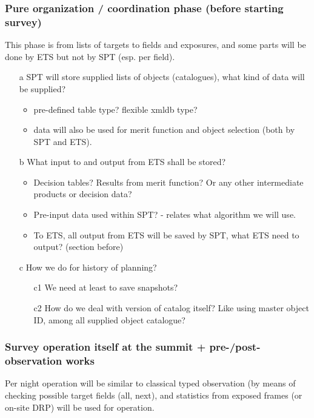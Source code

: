 \documentclass[a4paper,notitlepage]{article}
\begin{document}
\subsubsection{Pure organization / coordination phase (before starting survey)}

This phase is from lists of targets to fields and exposures, 
and some parts will be done by ETS but not by SPT (esp. per field). 

\begin{enumerate}
  \item[a] SPT will store supplied lists of objects (catalogues), what kind 
    of data will be supplied? 
    \begin{itemize}
      \item pre-defined table type? flexible xmldb type?
      \item data will also be used for merit function and object selection 
        (both by SPT and ETS).
    \end{itemize}
  \item[b] What input to and output from ETS shall be stored?
    \begin{itemize}
      \item Decision tables? Results from merit function? Or any other 
        intermediate products or decision data?
      \item Pre-input data used within SPT? - relates what algorithm we will use.
      \item To ETS, all output from ETS will be saved by SPT, what ETS need 
        to output? (section before)
    \end{itemize}
  \item[c] How we do for history of planning?
    \begin{enumerate}
      \item[c1] We need at least to save snapshots?
      \item[c2] How do we deal with version of catalog itself? Like using master 
        object ID, among all supplied object catalogue?
    \end{enumerate}
\end{enumerate}

\subsubsection{Survey operation itself at the summit + pre-/post- observation works}

Per night operation will be similar to classical typed observation
(by means of checking possible target fields (all, next), 
and statistics from exposed frames (or on-site DRP) will be used for 
operation. 
\end{document}
